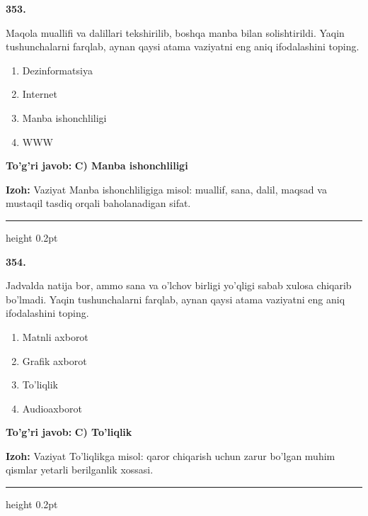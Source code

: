 \documentclass[10pt,a4paper,oneside]{article}
\begin{document}
\noindent\textbf{\color{ink}353.}
\par
Maqola muallifi va dalillari tekshirilib, boshqa manba bilan solishtirildi. Yaqin tushunchalarni farqlab, aynan qaysi atama vaziyatni eng aniq ifodalashini toping.
\begin{enumerate}[label=\Alph*),leftmargin=9mm]
\item Dezinformatsiya
\item Internet
\item Manba ishonchliligi
\item WWW
\end{enumerate}
\begin{tcolorbox}[enhanced,breakable,colback=teal!4,colframe=teal!50!black,boxrule=0.5pt,arc=1.1mm,left=3mm,right=3mm,top=1.7mm,bottom=1.7mm,before skip=2mm,after skip=2mm]
\textbf{\color{teal}To'g'ri javob:} \textbf{C) Manba ishonchliligi}
\par\smallskip
\textbf{Izoh:} Vaziyat Manba ishonchliligiga misol: muallif, sana, dalil, maqsad va mustaqil tasdiq orqali baholanadigan sifat.
\end{tcolorbox}
\vspace{2mm}\hrule height 0.2pt \vspace{3mm}

\noindent\textbf{\color{ink}354.}
\par
Jadvalda natija bor, ammo sana va o'lchov birligi yo'qligi sabab xulosa chiqarib bo'lmadi. Yaqin tushunchalarni farqlab, aynan qaysi atama vaziyatni eng aniq ifodalashini toping.
\begin{enumerate}[label=\Alph*),leftmargin=9mm]
\item Matnli axborot
\item Grafik axborot
\item To'liqlik
\item Audioaxborot
\end{enumerate}
\begin{tcolorbox}[enhanced,breakable,colback=teal!4,colframe=teal!50!black,boxrule=0.5pt,arc=1.1mm,left=3mm,right=3mm,top=1.7mm,bottom=1.7mm,before skip=2mm,after skip=2mm]
\textbf{\color{teal}To'g'ri javob:} \textbf{C) To'liqlik}
\par\smallskip
\textbf{Izoh:} Vaziyat To'liqlikga misol: qaror chiqarish uchun zarur bo'lgan muhim qismlar yetarli berilganlik xossasi.
\end{tcolorbox}
\vspace{2mm}\hrule height 0.2pt \vspace{3mm}
\end{document}
